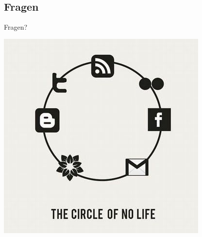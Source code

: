 \documentclass[18pt]{beamer}
\begin{document}
\subsection*{Fragen} %
\begin{frame}	
	\begin{center}
		\huge{Fragen?}
	\end{center}
\end{frame}



\begin{frame}[full]
\includegraphics[scale=0.55]{bilder/comics/September-25-2011-18-44-59-aa71ce1bd67502c27bc56a6b8d724897.jpeg}
\end{frame}
\end{document}
